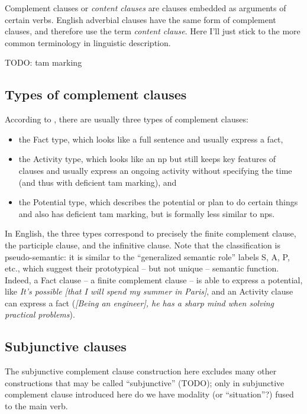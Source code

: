 \documentclass[UTF8, a4paper, oneside, scheme=plain, 12pt]{ctexbook}
\newcommand*{\citesec}[1]{\S~{#1}}
\newcommand*{\term}[1]{\emph{#1}}
\newcommand{\form}[1]{\emph{#1}}
\begin{document}
Complement clauses or \term{content clauses} \citep{cgel} are clauses embedded as arguments of certain verbs.
English adverbial clauses have the same form of complement clauses,
and therefore \citet{cgel} use the term \term{content clause}.
Here I'll just stick to the more common terminology in linguistic description.

TODO: \ac{tam} marking

\subsection{Types of complement clauses}

According to \citet[\citesec{18.4}]{dixon2010basic2},
there are usually three types of complement clauses:
\begin{itemize}
    \item the Fact type, which looks like a full sentence
    and usually express a fact, 
    \item the Activity type, which looks like an \acs{np}
    but still keeps key features of clauses 
    and usually express an ongoing activity 
    without specifying the time (and thus with deficient \acs{tam} marking), and 
    \item the Potential type,
    which describes the potential or plan to do certain things 
    and also has deficient \acs{tam} marking,
    but is formally less similar to \acs{np}s.
\end{itemize}
In English, the three types correspond to precisely 
the finite complement clause,
the participle clause,
and the infinitive clause.
Note that the classification is pseudo-semantic:
it is similar to the ``generalized semantic role'' labels S, A, P, etc.,
which suggest their prototypical -- but not unique -- semantic function.
Indeed, a Fact clause -- a finite complement clause -- 
is able to express a potential,
like \form{It's possible [that I will spend my summer in Paris]},
and an Activity clause can express a fact 
(\form{[Being an engineer], he has a sharp mind when solving practical problems}).

\subsection{Subjunctive clauses}\label{sec:complement.subjunctive}

The subjunctive complement clause construction here 
excludes many other constructions that may be called ``subjunctive'' (TODO);
only in subjunctive complement clause introduced here 
do we have modality (or ``situation''?) fused to the main verb.
\end{document}
